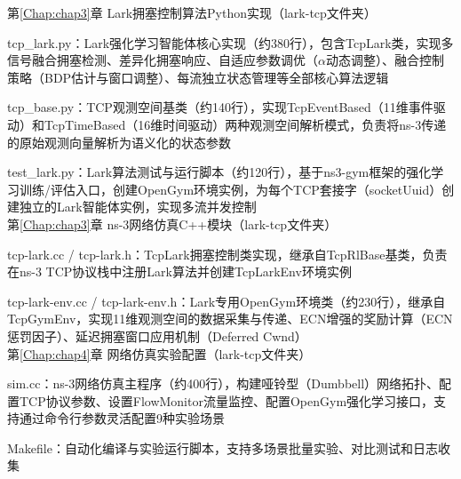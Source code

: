 \begin{ProgramList}

第\ref{Chap:chap3}章 Lark拥塞控制算法Python实现（lark-tcp文件夹）

tcp\_lark.py：Lark强化学习智能体核心实现（约380行），包含TcpLark类，实现多信号融合拥塞检测、差异化拥塞响应、自适应参数调优（$\alpha$动态调整）、融合控制策略（BDP估计与窗口调整）、每流独立状态管理等全部核心算法逻辑

tcp\_base.py：TCP观测空间基类（约140行），实现TcpEventBased（11维事件驱动）和TcpTimeBased（16维时间驱动）两种观测空间解析模式，负责将ns-3传递的原始观测向量解析为语义化的状态参数

test\_lark.py：Lark算法测试与运行脚本（约120行），基于ns3-gym框架的强化学习训练/评估入口，创建OpenGym环境实例，为每个TCP套接字（socketUuid）创建独立的Lark智能体实例，实现多流并发控制
\\

第\ref{Chap:chap3}章 ns-3网络仿真C++模块（lark-tcp文件夹）

tcp-lark.cc / tcp-lark.h：TcpLark拥塞控制类实现，继承自TcpRlBase基类，负责在ns-3 TCP协议栈中注册Lark算法并创建TcpLarkEnv环境实例

tcp-lark-env.cc / tcp-lark-env.h：Lark专用OpenGym环境类（约230行），继承自TcpGymEnv，实现11维观测空间的数据采集与传递、ECN增强的奖励计算（ECN惩罚因子）、延迟拥塞窗口应用机制（Deferred Cwnd）
\\

第\ref{Chap:chap4}章 网络仿真实验配置（lark-tcp文件夹）

sim.cc：ns-3网络仿真主程序（约400行），构建哑铃型（Dumbbell）网络拓扑、配置TCP协议参数、设置FlowMonitor流量监控、配置OpenGym强化学习接口，支持通过命令行参数灵活配置9种实验场景

Makefile：自动化编译与实验运行脚本，支持多场景批量实验、对比测试和日志收集

\end{ProgramList}
